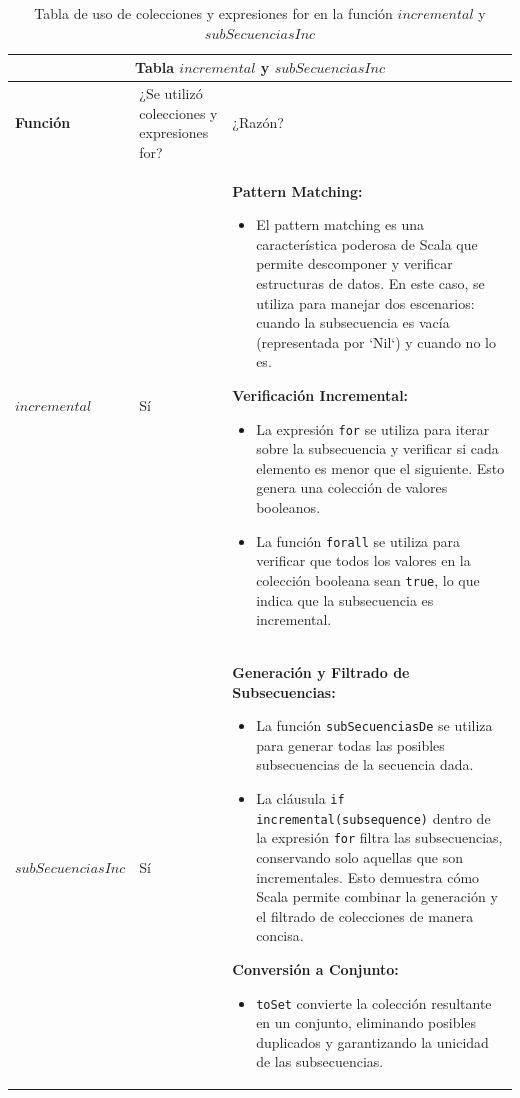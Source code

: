 \documentclass[12pt, a4paper]{article}
\begin{document}
\begin{table}[H]
    \scriptsize
   \begin{tabular}{ |p{4cm}|p{3cm}|p{5.5cm}|  }
    \hline
    \multicolumn{3}{|c|}{Tabla $incremental$ y $subSecuenciasInc$} \\
    \hline
    \textbf{Función}& ¿Se utilizó colecciones y expresiones for?  & ¿Razón?\\
    \hline
     $incremental$ & Sí &  
       \textbf{Pattern Matching:}
      \begin{itemize}
          \item El pattern matching es una característica poderosa de Scala que permite descomponer y verificar estructuras de datos. En este caso, se utiliza para manejar dos escenarios: cuando la subsecuencia es vacía (representada por `Nil`) y cuando no lo es.
      \end{itemize}
      
       \textbf{Verificación Incremental:}
      \begin{itemize}
          \item La expresión \texttt{for} se utiliza para iterar sobre la subsecuencia y verificar si cada elemento es menor que el siguiente. Esto genera una colección de valores booleanos.
          \item La función \texttt{forall} se utiliza para verificar que todos los valores en la colección booleana sean \texttt{true}, lo que indica que la subsecuencia es incremental.
      \end{itemize}
   \\
     \hline
     $subSecuenciasInc$ & Sí &  
       \textbf{Generación y Filtrado de Subsecuencias:}
      \begin{itemize}
          \item La función \texttt{subSecuenciasDe} se utiliza para generar todas las posibles subsecuencias de la secuencia dada.
          \item La cláusula \texttt{if incremental(subsequence)} dentro de la expresión \texttt{for} filtra las subsecuencias, conservando solo aquellas que son incrementales. Esto demuestra cómo Scala permite combinar la generación y el filtrado de colecciones de manera concisa.
      \end{itemize}
      
       \textbf{Conversión a Conjunto:}
      \begin{itemize}
          \item \texttt{toSet} convierte la colección resultante en un conjunto, eliminando posibles duplicados y garantizando la unicidad de las subsecuencias.
      \end{itemize}
  \\
     \hline
   \end{tabular}
   \centering
   \caption{Tabla de uso de colecciones y expresiones for en la función $incremental$ y $subSecuenciasInc$}
   \end{table}
\end{document}
